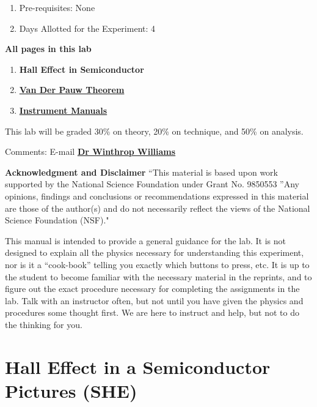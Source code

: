 \documentclass{../lab}
\begin{document}
\begin{enumerate}
    \item Pre-requisites: None

    \item Days Allotted for the Experiment: 4
\end{enumerate}

\noindent\textbf{All pages in this lab}

\begin{enumerate}
    \item \textbf{Hall Effect in Semiconductor}

    \item \href{https://berkeley-physics111b.github.io/appendices/SHE-Van-Der-Pauw-Theorem/}{\textbf{Van Der Pauw Theorem}}
    
    \item \href{https://berkeley-physics111b.github.io/appendices/SHE-Instrument-Manuals/}{\textbf{Instrument Manuals}}
\end{enumerate}

This lab will be graded 30\% on theory, 20\% on technique, and 50\% on analysis.

Comments: E-mail \href{\MailLabManager}{\textbf{Dr Winthrop Williams}}

\textbf{Acknowledgment and Disclaimer} ``This material is based upon work supported by the National Science Foundation under Grant No. 9850553 ''Any opinions, findings and conclusions or recommendations expressed in this material are those of the author(s) and do not necessarily reflect the views of the National Science Foundation (NSF)."

This manual is intended to provide a general guidance for the lab. It is not designed to explain all the physics necessary for understanding this experiment, nor is it a ``cook-book'' telling you exactly which buttons to press, etc. It is up to the student to become familiar with the necessary material in the reprints, and to figure out the exact procedure necessary for completing the assignments in the lab. Talk with an instructor often, but not until you have given the physics and procedures some thought first. We are here to instruct and help, but not to do the thinking for you.

\section{Hall Effect in a Semiconductor Pictures (SHE)}
\end{document}
